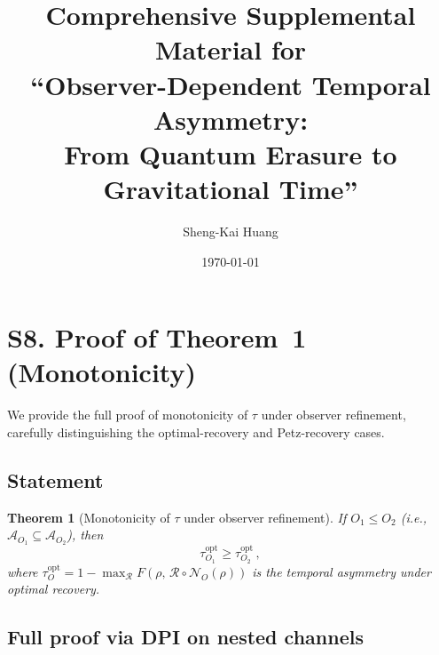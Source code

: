 \documentclass[aps,prd,preprint,superscriptaddress,longbibliography]{revtex4-2}
\newtheorem{theorem}{Theorem}
\newcommand{\Petz}{\mathcal{R}}
\newcommand{\chan}{\mathcal{N}}
\newcommand{\tauasym}{\tau}
\newcommand{\algO}{\mathcal{A}}
\begin{document}
\title{Comprehensive Supplemental Material for\\
``Observer-Dependent Temporal Asymmetry:\\
From Quantum Erasure to Gravitational Time''}

\author{Sheng-Kai Huang}

\date{\today}

\maketitle

\tableofcontents

\section{S8. Proof of Theorem~1 (Monotonicity)}
\label{sec:monotonicity}

We provide the full proof of monotonicity of $\tauasym$ under observer
refinement, carefully distinguishing the optimal-recovery and
Petz-recovery cases.

\subsection{Statement}

\begin{theorem}[Monotonicity of $\tauasym$ under observer refinement]
\label{thm:mono_full}
If $O_1 \leq O_2$ (i.e., $\algO_{O_1} \subseteq \algO_{O_2}$), then
\begin{equation}
  \tauasym_{O_1}^{\mathrm{opt}} \geq \tauasym_{O_2}^{\mathrm{opt}}\,,
  \label{eq:mono_full}
\end{equation}
where $\tauasym_O^{\mathrm{opt}} = 1 - \max_{\Petz}
F(\rho,\,\Petz \circ \chan_O(\rho))$ is the temporal asymmetry under
optimal recovery.
\end{theorem}

\subsection{Full proof via DPI on nested channels}
\end{document}
